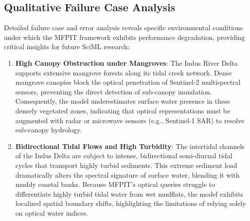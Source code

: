 \documentclass[journal]{IEEEtran}
\begin{document}
\subsection{Qualitative Failure Case Analysis}
Detailed failure case and error analysis reveals specific environmental conditions under which the MFPIT framework exhibits performance degradation, providing critical insights for future SciML research:
\begin{enumerate}
    \item \textbf{High Canopy Obstruction under Mangroves}: The Indus River Delta supports extensive mangrove forests along its tidal creek network. Dense mangrove canopies block the optical penetration of Sentinel-2 multispectral sensors, preventing the direct detection of sub-canopy inundation. Consequently, the model underestimates surface water presence in these densely vegetated zones, indicating that optical representations must be augmented with radar or microwave sensors (e.g., Sentinel-1 SAR) to resolve sub-canopy hydrology.
    \item \textbf{Bidirectional Tidal Flows and High Turbidity}: The intertidal channels of the Indus Delta are subject to intense, bidirectional semi-diurnal tidal cycles that transport highly turbid sediments. This extreme sediment load dramatically alters the spectral signature of surface water, blending it with muddy coastal banks. Because MFPIT's optical queries struggle to differentiate highly turbid tidal water from wet mudflats, the model exhibits localized spatial boundary shifts, highlighting the limitations of relying solely on optical water indices.
\end{enumerate}
\end{document}
